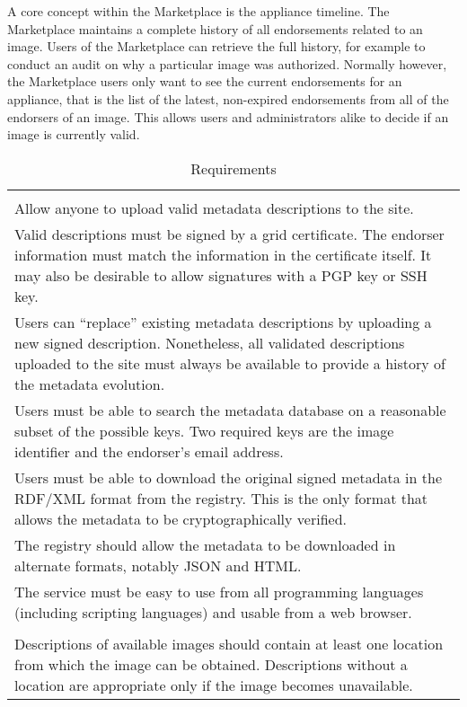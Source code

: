 A core concept within the Marketplace is the appliance timeline.  The
Marketplace maintains a complete history of all endorsements related
to an image.  Users of the Marketplace can retrieve the full history,
for example to conduct an audit on why a particular image was
authorized.  Normally however, the Marketplace users only want to see
the current endorsements for an appliance, that is the list of the
latest, non-expired endorsements from all of the endorsers of an
image.  This allows users and administrators alike to decide if an
image is currently valid.  

\begin{table}
\caption{Requirements}
\label{tab:requirements}
\begin{tabular}{p{}}
\hline\hline

\\ Allow anyone to upload valid metadata descriptions to the site.

\\ Valid descriptions must be signed by a grid certificate.  The
  endorser information must match the information in the certificate
  itself.  It may also be desirable to allow signatures with a PGP key
  or SSH key.

\\ Users can ``replace'' existing metadata descriptions by
  uploading a new signed description.  Nonetheless, all validated
  descriptions uploaded to the site must always be available to
  provide a history of the metadata evolution.

\\ Users must be able to search the metadata database on a
  reasonable subset of the possible keys.  Two required keys are the
  image identifier and the endorser's email address.

\\ Users must be able to download the original signed metadata in
  the RDF/XML format from the registry.  This is the only format that
  allows the metadata to be cryptographically verified.

\\ The registry should allow the metadata to be downloaded in
  alternate formats, notably JSON and HTML.

\\ The service must be easy to use from all programming languages
  (including scripting languages) and usable from a web browser.

\\ \hline 
\\
  Descriptions of available images should contain at least one
  location from which the image can be obtained.  Descriptions without
  a location are appropriate only if the image becomes unavailable.


\end{tabular}
\end{table}
